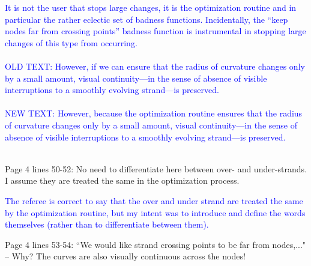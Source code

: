 \documentclass[12pt]{article}
\begin{document}
\textcolor{blue}{It is not the user that stops large changes, it is
  the optimization routine and in particular the rather eclectic set
  of badness functions.  Incidentally, the ``keep nodes far from
  crossing points'' badness function is instrumental in stopping large
  changes of this type from occurring.\\ \\ OLD TEXT: However, if we
  can ensure that the radius of curvature changes only by a small
  amount, visual continuity---in the sense of absence of visible
  interruptions to a smoothly evolving strand---is
  preserved. \\ \\ NEW TEXT: However, because the optimization routine
  ensures that the radius of curvature changes only by a small
  amount, visual continuity---in the sense of absence of visible
  interruptions to a smoothly evolving strand---is
  preserved.\\ \\
}

Page 4 lines 50-52: No need to differentiate here between over- and
under-strands.  I assume they are treated the same in the optimization
process.

\textcolor{blue}{The referee is correct to say that the over and under
  strand are treated the same by the optimization routine, but my
  intent was to introduce and define the words themselves (rather than
  to differentiate between them).}

Page 4 lines 53-54: ``We would like strand crossing points to be far
from nodes,..."  -- Why?  The curves are also visually continuous across
the nodes!
\end{document}
